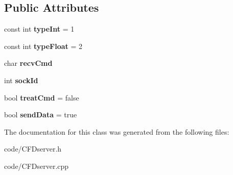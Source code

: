 \subsection*{Public Attributes}
\begin{DoxyCompactItemize}
\item 
\mbox{\label{class_c_f_dserver_a03eefa056119109ea0861f9027cf5fc6}} 
const int {\bfseries type\+Int} = 1
\item 
\mbox{\label{class_c_f_dserver_aecaee59eb185de1adf3ac6a341ed2f86}} 
const int {\bfseries type\+Float} = 2
\item 
\mbox{\label{class_c_f_dserver_aae8544d933e4a1da40693a3f17781611}} 
char {\bfseries recv\+Cmd}
\item 
\mbox{\label{class_c_f_dserver_a90ad80f88bc3e76fc5caeb9f3d97449a}} 
int {\bfseries sock\+Id}
\item 
\mbox{\label{class_c_f_dserver_ad09f73621e29d38757595d6eb7477158}} 
bool {\bfseries treat\+Cmd} = false
\item 
\mbox{\label{class_c_f_dserver_a0dc9c18471d2b0aa6b1dd8c9c679604f}} 
bool {\bfseries send\+Data} = true
\end{DoxyCompactItemize}


The documentation for this class was generated from the following files\+:\begin{DoxyCompactItemize}
\item 
code/C\+F\+Dserver.\+h\item 
code/C\+F\+Dserver.\+cpp\end{DoxyCompactItemize}
